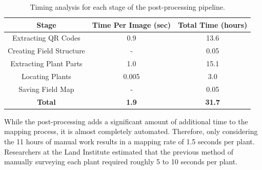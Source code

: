 \begin{table}
    \begin{center}
    \begin{tabular}[c]{|c|c|c|}
        \hline
        Stage & Time Per Image (sec) & Total Time (hours) \\
        \hline
        Extracting QR Codes & 0.9 & 13.6   \\
        Creating Field Structure & - & 0.05   \\
		Extracting Plant Parts & 1.0 & 15.1   \\
		Locating Plants & 0.005 & 3.0   \\
		Saving Field Map & - & 0.05   \\
		\hline
		\textbf{Total} & \textbf{1.9} & \textbf{31.7}   \\ 
        \hline
    \end{tabular}
    \caption[Post-processing time analysis]{Timing analysis for each stage of the post-processing pipeline.}
    \label{table:timing_analysis}
   \end{center}
\end{table}

While the post-processing adds a significant amount of additional time to the mapping process, it is almost completely automated.  Therefore, only considering the 11 hours of manual work results in a mapping rate of 1.5 seconds per plant.  Researchers at the Land Institute estimated that the previous method of manually surveying each plant required roughly 5 to 10 seconds per plant.  

